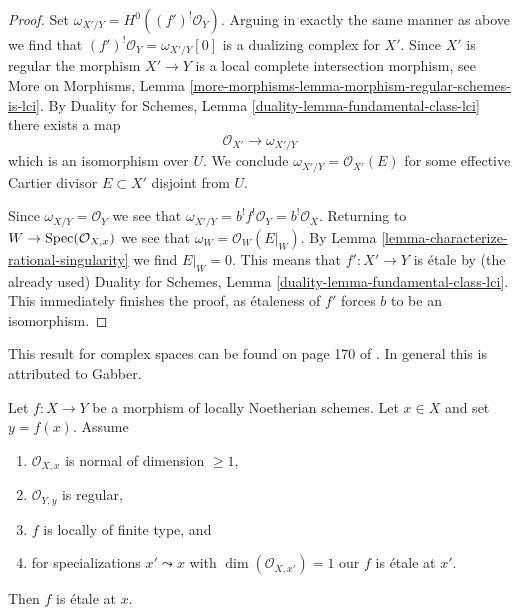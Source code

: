 \begin{proof}
\medskip\noindent
Set $\omega_{X'/Y} = H^0((f')^!\mathcal{O}_Y)$. Arguing in exactly the
same manner as above we find that $(f')^!\mathcal{O}_Y = \omega_{X'/Y}[0]$
is a dualizing complex for $X'$. Since $X'$ is regular
the morphism $X' \to Y$ is a local complete intersection morphism, see
More on Morphisms, Lemma
\ref{more-morphisms-lemma-morphism-regular-schemes-is-lci}.
By Duality for Schemes, Lemma \ref{duality-lemma-fundamental-class-lci}
there exists a map
$$
\mathcal{O}_{X'} \longrightarrow \omega_{X'/Y}
$$
which is an isomorphism over $U$. We conclude
$\omega_{X'/Y} = \mathcal{O}_{X'}(E)$ for some effective
Cartier divisor $E \subset X'$ disjoint from $U$.

\medskip\noindent
Since $\omega_{X/Y} = \mathcal{O}_Y$ we see that
$\omega_{X'/Y} = b^! f^!\mathcal{O}_Y = b^!\mathcal{O}_X$.
Returning to $W \to \mathop{\mathrm{Spec}}(\mathcal{O}_{X, x})$
we see that $\omega_W = \mathcal{O}_W(E|_W)$.
By Lemma \ref{lemma-characterize-rational-singularity}
we find $E|_W = 0$.
This means that $f' : X' \to Y$ is \'etale by (the already used)
Duality for Schemes, Lemma \ref{duality-lemma-fundamental-class-lci}.
This immediately finishes the proof, as \'etaleness
of $f'$ forces $b$ to be an isomorphism.
\end{proof}

\begin{lemma}
\label{lemma-purity-ramification}
\begin{reference}
This result for complex spaces can be found on page 170 of \cite{Fischer}.
In general this is \cite[Theorem 2.4]{Zong} attributed to Gabber.
\end{reference}
Let $f : X \to Y$ be a morphism of locally Noetherian schemes.
Let $x \in X$ and set $y = f(x)$. Assume
\begin{enumerate}
\item $\mathcal{O}_{X, x}$ is normal of dimension $\geq 1$,
\item $\mathcal{O}_{Y, y}$ is regular,
\item $f$ is locally of finite type, and
\item for specializations $x' \leadsto x$ with
$\dim(\mathcal{O}_{X, x'}) = 1$ our $f$ is \'etale at $x'$.
\end{enumerate}
Then $f$ is \'etale at $x$.
\end{lemma}


